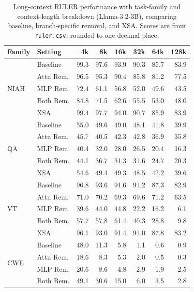 \begin{table}[t]
  \caption{Long-context RULER performance with task-family and context-length breakdown
  (Llama-3.2-3B), comparing baseline, branch-specific removal, and XSA.
  Scores are from \texttt{ruler.csv}, rounded to one decimal place.}
  \label{tab:longcontext-ruler}
  \centering
  \scriptsize
  \setlength{\tabcolsep}{3.5pt}
  \begin{tabular}{llrrrrrr}
    \toprule
    Family & Setting & 4k & 8k & 16k & 32k & 64k & 128k \\
    \midrule
    \multirow{5}{*}{NIAH}
      & Baseline & 99.3 & 97.6 & 93.9 & 90.3 & 85.7 & 83.9 \\
      & Attn Rem. & 96.5 & 95.3 & 90.4 & 85.8 & 81.2 & 77.5 \\
      & MLP Rem. & 72.4 & 61.1 & 56.8 & 52.0 & 49.6 & 43.5 \\
      & Both Rem. & 84.8 & 71.5 & 62.6 & 55.5 & 53.0 & 48.0 \\
      & XSA & 99.4 & 97.7 & 94.0 & 90.7 & 85.9 & 83.9 \\
    \midrule
    \multirow{5}{*}{QA}
      & Baseline & 55.0 & 49.6 & 49.0 & 48.1 & 41.8 & 39.9 \\
      & Attn Rem. & 45.7 & 40.5 & 42.3 & 42.8 & 36.9 & 35.8 \\
      & MLP Rem. & 40.4 & 32.0 & 28.0 & 26.5 & 20.4 & 16.3 \\
      & Both Rem. & 44.1 & 36.7 & 31.3 & 31.6 & 24.7 & 20.3 \\
      & XSA & 54.6 & 49.4 & 49.3 & 48.5 & 42.2 & 39.6 \\
    \midrule
    \multirow{5}{*}{VT}
      & Baseline & 96.8 & 93.6 & 91.6 & 91.2 & 87.3 & 82.9 \\
      & Attn Rem. & 71.0 & 70.2 & 69.3 & 69.6 & 71.2 & 63.5 \\
      & MLP Rem. & 39.6 & 44.0 & 44.8 & 22.2 & 16.2 & 6.1 \\
      & Both Rem. & 57.7 & 57.8 & 61.4 & 40.3 & 28.8 & 9.8 \\
      & XSA & 96.1 & 93.0 & 91.4 & 91.0 & 87.8 & 83.2 \\
    \midrule
    \multirow{5}{*}{CWE}
      & Baseline & 48.0 & 11.3 & 5.8 & 1.1 & 0.6 & 0.9 \\
      & Attn Rem. & 18.6 & 8.3 & 5.3 & 2.0 & 0.5 & 0.3 \\
      & MLP Rem. & 20.6 & 8.6 & 4.8 & 2.9 & 1.9 & 2.5 \\
      & Both Rem. & 49.1 & 30.6 & 15.0 & 6.0 & 3.5 & 2.8 \\

\end{tabular}
\end{table}
